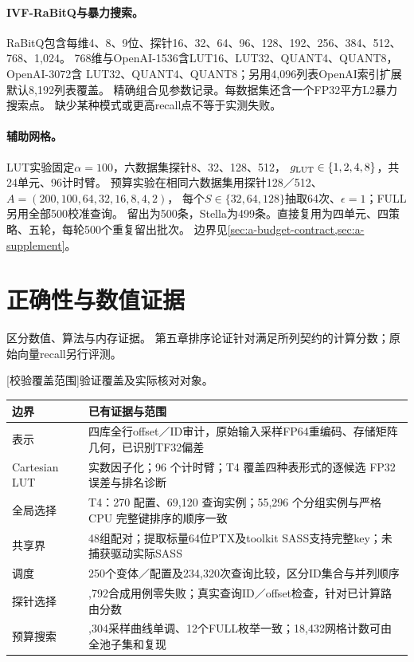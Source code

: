 \paragraph{IVF-RaBitQ与暴力搜索。}
RaBitQ包含每维4、8、9位、探针16、32、64、96、128、192、256、384、512、768、1,024。
768维与OpenAI-1536含LUT16、LUT32、QUANT4、QUANT8，OpenAI-3072含
LUT32、QUANT4、QUANT8；另用4,096列表OpenAI索引扩展默认8,192列表覆盖。
精确组合见参数记录。每数据集还含一个FP32平方L2暴力搜索点。
缺少某种模式或更高recall点不等于实测失败。

\paragraph{辅助网格。}
LUT实验固定$\alpha=100$，六数据集探针8、32、128、512，
$g_{\mathrm{LUT}}\in\{1,2,4,8\}$，共24单元、96计时臂。
预算实验在相同六数据集用探针128／512、$A=(200,100,64,32,16,8,4,2)$，
每个$S\in\{32,64,128\}$抽取64次、$\epsilon=1$；FULL另用全部500校准查询。
留出为500条，Stella为499条。直接复用为四单元、四策略、五轮，每轮500个重复留出批次。
边界见\cref{sec:a-budget-contract,sec:a-supplement}。

\section{正确性与数值证据}
\label{sec:b-correctness}
区分数值、算法与内存证据。
第五章排序论证针对满足所列契约的计算分数；原始向量recall另行评测。

\par\medskip\noindent\begin{minipage}{\linewidth}
\centering\captionsetup{hypcap=false}
[校验覆盖范围]{验证覆盖及实际核对对象。}
\label{tab:b-checks}
\footnotesize\setlength{\tabcolsep}{4pt}
\begin{tabularx}{\linewidth}{@{}>{\raggedright\arraybackslash}p{.22\linewidth}>{\raggedright\arraybackslash}X@{}}
\toprule
边界 & 已有证据与范围 \\
\midrule
表示 & 四库全行offset／ID审计，原始输入采样FP64重编码、存储矩阵几何，已识别TF32偏差 \\
Cartesian LUT & 实数因子化；96 个计时臂；T4 覆盖四种表形式的逐候选 FP32 误差与排名诊断 \\
全局选择 & T4：270 配置、69,120 查询实例；55,296 个分组实例与严格 CPU 完整键排序的顺序一致 \\
共享界 & 48组配对；提取标量64位PTX及toolkit SASS支持完整key；未捕获驱动实际SASS \\
调度 & 250个变体／配置及234,320次查询比较，区分ID集合与并列顺序 \\
探针选择 & 1,792合成用例零失败；真实查询ID／offset检查，针对已计算路由分数 \\
预算搜索 & 2,304采样曲线单调、12个FULL枚举一致；18,432网格计数可由全池子集和复现 \\
\bottomrule
\end{tabularx}
\end{minipage}\par\medskip

